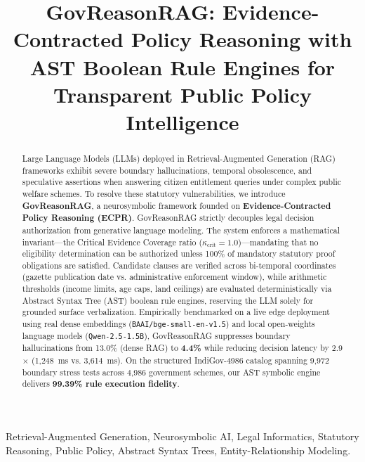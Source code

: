 \documentclass[conference]{IEEEtran}
\begin{document}
\title{GovReasonRAG: Evidence-Contracted Policy Reasoning with AST Boolean Rule Engines for Transparent Public Policy Intelligence}

\author{
}

\maketitle

\begin{abstract}
Large Language Models (LLMs) deployed in Retrieval-Augmented Generation (RAG) frameworks exhibit severe boundary hallucinations, temporal obsolescence, and speculative assertions when answering citizen entitlement queries under complex public welfare schemes. To resolve these statutory vulnerabilities, we introduce \textbf{GovReasonRAG}, a neurosymbolic framework founded on \textbf{Evidence-Contracted Policy Reasoning (ECPR)}. GovReasonRAG strictly decouples legal decision authorization from generative language modeling. The system enforces a mathematical invariant---the Critical Evidence Coverage ratio ($\kappa_{\text{crit}} = 1.0$)---mandating that no eligibility determination can be authorized unless 100\% of mandatory statutory proof obligations are satisfied. Candidate clauses are verified across bi-temporal coordinates (gazette publication date vs. administrative enforcement window), while arithmetic thresholds (income limits, age caps, land ceilings) are evaluated deterministically via Abstract Syntax Tree (AST) boolean rule engines, reserving the LLM solely for grounded surface verbalization. Empirically benchmarked on a live edge deployment using real dense embeddings (\texttt{BAAI/bge-small-en-v1.5}) and local open-weights language models (\texttt{Qwen-2.5-1.5B}), GovReasonRAG suppresses boundary hallucinations from 13.0\% (dense RAG) to \textbf{4.4\%} while reducing decision latency by 2.9$\times$ (1,248~ms vs. 3,614~ms). On the structured IndiGov-4986 catalog spanning 9,972 boundary stress tests across 4,986 government schemes, our AST symbolic engine delivers \textbf{99.39\% rule execution fidelity}.
\end{abstract}

\begin{IEEEkeywords}
Retrieval-Augmented Generation, Neurosymbolic AI, Legal Informatics, Statutory Reasoning, Public Policy, Abstract Syntax Trees, Entity-Relationship Modeling.
\end{IEEEkeywords}
\end{document}
